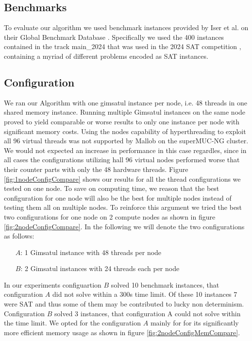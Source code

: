 \documentclass[12pt,a4paper,twoside]{scrartcl}
\numberwithin{equation}{section}
\begin{document}
\subsection{Benchmarks}
To evaluate our algorithm we used benchmark instances provided by Iser et al. on their Global Benchmark Database \cite{benchmarkDB}. Specifically we used the 400 instances contained in the track main\_2024 that was used in the 2024 SAT competition \cite{satComp2024}, containing a myriad of different problems encoded as SAT instances.

\subsection{Configuration}
We ran our Algorithm with one gimsatul instance per node, i.e. 48 threads in one shared memory instance. Running multiple Gimsatul instances on the same node proved to yield comparable or worse results to only one instance per node with significant memory costs. Using the nodes capability of hyperthreading to exploit all 96 virtual threads was not supported by Mallob on the superMUC-NG cluster. We would not expected an increase in performance in this case regardles, since in all cases the configurations utilizing hall 96 virtual nodes performed worse that their counter parts with only the 48 hardware threads. Figure \ref{fig:1nodeConfigCompare} shows our results for all the thread configurations we tested on one node. To save on computing time, we reason that the best configuration for one node will also be the best for multiple nodes instead of testing them all on multiple nodes. To reinforce this argument we tried the best two configurations for one node on 2 compute nodes as shown in figure \ref{fig:2nodeConfigCompare}. In the following we will denote the two configurations as follows:
\begin{itemize}
  \item[$A$:] 1 Gimsatul instance with 48 threads per node
  \item[$B$:] 2 Gimsatul instances with 24 threads each per node
\end{itemize}
In our experiments configuartion $B$ solved 10 benchmark instances, that configuration $A$ did not solve within a 300s time limit. Of these 10 instances 7 were SAT and thus some of them may be contributed to lucky non determinism. Configuration $B$ solved 3 instances, that configuration A could not solve within the time limit. We opted for the configuration $A$ mainly for for its significantly more efficient memory usage as shown in figure \ref{fig:2nodeConfigMemCompare}.
\end{document}
